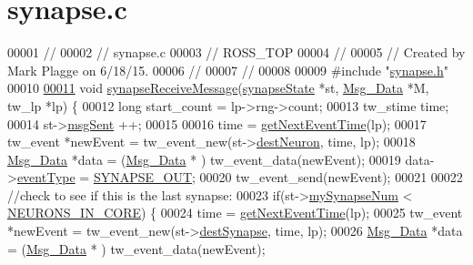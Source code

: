 \hypertarget{synapse_8c_source}{}\section{synapse.\+c}
\label{synapse_8c_source}

\begin{DoxyCode}
00001 \textcolor{comment}{//}
00002 \textcolor{comment}{//  synapse.c}
00003 \textcolor{comment}{//  ROSS\_TOP}
00004 \textcolor{comment}{//}
00005 \textcolor{comment}{//  Created by Mark Plagge on 6/18/15.}
00006 \textcolor{comment}{//}
00007 \textcolor{comment}{//}
00008 
00009 \textcolor{preprocessor}{#include "\hyperlink{synapse_8h}{synapse.h}"}
00010 
\hypertarget{synapse_8c_source_l00011}{}\hyperlink{synapse_8h_a751f7a42bfc55f55fc0fd299165c5906}{00011} \textcolor{keywordtype}{void} \hyperlink{synapse_8c_a751f7a42bfc55f55fc0fd299165c5906}{synapseReceiveMessage}(\hyperlink{structsynapse_state}{synapseState} *st, 
      \hyperlink{struct_msg___data}{Msg\_Data} *M, tw\_lp *lp) \{
00012     \textcolor{keywordtype}{long} start\_count = lp->rng->count;
00013     tw\_stime time;
00014     st->\hyperlink{structsynapse_state_a7d208d07285a221f4ef19f6fa307b536}{msgSent} ++;
00015 
00016     time = \hyperlink{assist_8c_a30602b11dbfa6bcb90dc00e7942cfb02}{getNextEventTime}(lp);
00017     tw\_event *newEvent = tw\_event\_new(st->\hyperlink{structsynapse_state_a0710dca002b4b3a3f7ae72633bef3691}{destNeuron}, time, lp);
00018     \hyperlink{struct_msg___data}{Msg\_Data} *data = (\hyperlink{struct_msg___data}{Msg\_Data} * ) tw\_event\_data(newEvent);
00019     data->\hyperlink{struct_msg___data_a015b6eb45982e1842ee8fc389a099ced}{eventType} = \hyperlink{assist_8h_a7c1688de451e0dea1e11617bce3ec450a6ad6b93d8a818550e7246f6e0d143afb}{SYNAPSE\_OUT};
00020     tw\_event\_send(newEvent);
00021 
00022         \textcolor{comment}{//check to see if this is the last synapse:}
00023     \textcolor{keywordflow}{if}(st->\hyperlink{structsynapse_state_ab73db495221608d3eae73d51670d29f0}{mySynapseNum} < \hyperlink{assist_8h_a67e8e45768f76b984a60fcff2b7c51aa}{NEURONS\_IN\_CORE}) \{
00024             time = \hyperlink{assist_8c_a30602b11dbfa6bcb90dc00e7942cfb02}{getNextEventTime}(lp);
00025             tw\_event *newEvent = tw\_event\_new(st->\hyperlink{structsynapse_state_a665999819b255f36d756f17b85bc9a03}{destSynapse}, time, lp);
00026             \hyperlink{struct_msg___data}{Msg\_Data} *data = (\hyperlink{struct_msg___data}{Msg\_Data} * ) tw\_event\_data(newEvent);

\end{DoxyCode}
